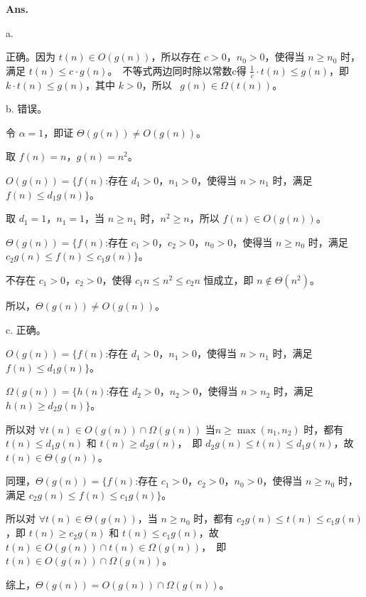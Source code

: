 \documentclass[12pt, a4paper, UTF8, fontset=windows]{ctexbook}
\newenvironment{solution}{\par\noindent\textbf{Ans.}}{\par}
\begin{document}
\begin{solution}

    a. 
    
    正确。因为 $t(n) \in O(g(n))$，所以存在 $c > 0$，$n_0 > 0$，使得当 $ n \ge n_0$ 时，满足 $t(n) \leq c \cdot g(n)$。\ 
    不等式两边同时除以常数c得 $\frac{1}{c} \cdot t(n) \leq g(n)$，即 $k \cdot t(n) \leq g(n)$，其中 $k > 0$，所以 \
    $g(n) \in \Omega(t(n))$。
    \vspace{2mm}  %
    
    b. 错误。

    令 $\alpha = 1$，即证 $\Theta(g(n)) \neq O(g(n))$。

    取 $f(n) = n$，$g(n) = n^2$。
    
    $O(g(n)) = \{f(n)$:存在 $d_1 > 0$，$n_1 > 0$，使得当 $n > n_1$ 时，满足 $f(n) \le  d_1 g(n)\}$。

    取 $d_1 = 1$，$n_1 = 1$，当 $n \ge n_1$ 时，$n^2 \ge n$，所以 $f(n) \in O(g(n))$。

    $\Theta(g(n)) = \{f(n)$:存在 $c_1 >0$，$c_2 >0$，$n_0 > 0$，使得当 $n \ge n_0$ 时，满足 $c_2 g(n) \le f(n) \le c_1 g(n)\}$。 

    不存在 $c_1 > 0$，$c_2 > 0$，使得 $c_1 n \le n^2 \le c_2 n$ 恒成立，即 $n \notin \Theta(n^2)$。

    所以，$\Theta(g(n)) \neq O(g(n))$。
    \vspace{2mm}  %

    c. 正确。 

    $O(g(n)) = \{f(n)$:存在 $d_1 > 0$，$n_1 > 0$，使得当 $n > n_1$ 时，满足 $f(n) \le  d_1 g(n)\}$。 

    $\Omega(g(n)) = \{h(n)$:存在 $d_2 > 0$，$n_2 > 0$，使得当 $n > n_2$ 时，满足 $h(n) \ge d_2 g(n)\}$。
    
    所以对 $\forall t(n) \in O(g(n)) \cap \Omega(g(n))$ 当$n \ge \max(n_1, n_2)$ 时，都有 $t(n) \le d_1 g(n)$ 和 $t(n) \ge d_2 g(n)$，\
    即 $d_2 g(n) \le t(n) \le d_1 g(n)$，故 $t(n) \in \Theta(g(n))$。

    同理，$\Theta(g(n)) = \{f(n)$:存在 $c_1 >0$，$c_2 >0$，$n_0 > 0$，使得当 $n \ge n_0$ 时，满足 $c_2 g(n) \le f(n) \le c_1 g(n)\}$。 

    所以对 $\forall t(n) \in \Theta(g(n))$，当 $n \ge n_0$ 时，都有 $c_2 g(n) \le t(n) \le c_1 g(n)$，即 $t(n) \ge c_2 g(n)$ 和 $t(n) \le c_1 g(n)$，故 $t(n) \in O(g(n)) \cap t(n) \in \Omega(g(n))$，\
    即 $t(n) \in O(g(n)) \cap \Omega(g(n))$。
    
    综上，$\Theta(g(n)) = O(g(n)) \cap \Omega(g(n))$。
    \vspace{2mm}  %


\end{solution}
\end{document}
